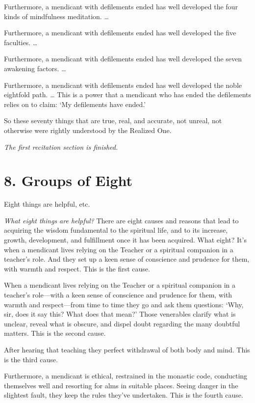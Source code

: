 \documentclass[12pt,openany]{book}%
\newcommand*{\scendsection}[1]{\begin{Center}\begin{small}\textit{#1}\end{small}\end{Center}\addvspace{1em}}
\begin{document}
Furthermore, a mendicant with defilements ended has well developed the four kinds of mindfulness meditation. … 

Furthermore, a mendicant with defilements ended has well developed the five faculties. … 

Furthermore, a mendicant with defilements ended has well developed the seven awakening factors. … 

Furthermore, a mendicant with defilements ended has well developed the noble eightfold path. … This is a power that a mendicant who has ended the defilements relies on to claim: ‘My defilements have ended.’ 

So these seventy things that are true, real, and accurate, not unreal, not otherwise were rightly understood by the Realized One. 

\scendsection{The first recitation section is finished. }

\section*{8. Groups of Eight }

Eight things are helpful, etc. 

\emph{What eight things are helpful?} There are eight causes and reasons that lead to acquiring the wisdom fundamental to the spiritual life, and to its increase, growth, development, and fulfillment once it has been acquired. What eight? It’s when a mendicant lives relying on the Teacher or a spiritual companion in a teacher’s role. And they set up a keen sense of conscience and prudence for them, with warmth and respect. This is the first cause. 

When a mendicant lives relying on the Teacher or a spiritual companion in a teacher’s role—with a keen sense of conscience and prudence for them, with warmth and respect—from time to time they go and ask them questions: ‘Why, sir, does it say this? What does that mean?’ Those venerables clarify what is unclear, reveal what is obscure, and dispel doubt regarding the many doubtful matters. This is the second cause. 

After hearing that teaching they perfect withdrawal of both body and mind. This is the third cause. 

Furthermore, a mendicant is ethical, restrained in the monastic code, conducting themselves well and resorting for alms in suitable places. Seeing danger in the slightest fault, they keep the rules they’ve undertaken. This is the fourth cause. 
\end{document}
